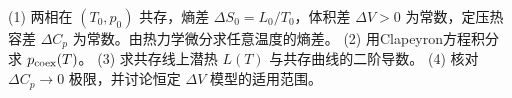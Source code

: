 (1) 两相在 \((T_0,p_0)\) 共存，熵差 \(\Delta S_0=L_0/T_0\)，体积差 \(\Delta V>0\) 为常数，定压热容差 \(\Delta C_p\) 为常数。由热力学微分求任意温度的熵差。
(2) 用Clapeyron方程积分求 \(p_{\rm coex}(T)\)。
(3) 求共存线上潜热 \(L(T)\) 与共存曲线的二阶导数。
(4) 核对 \(\Delta C_p\to0\) 极限，并讨论恒定 \(\Delta V\) 模型的适用范围。
